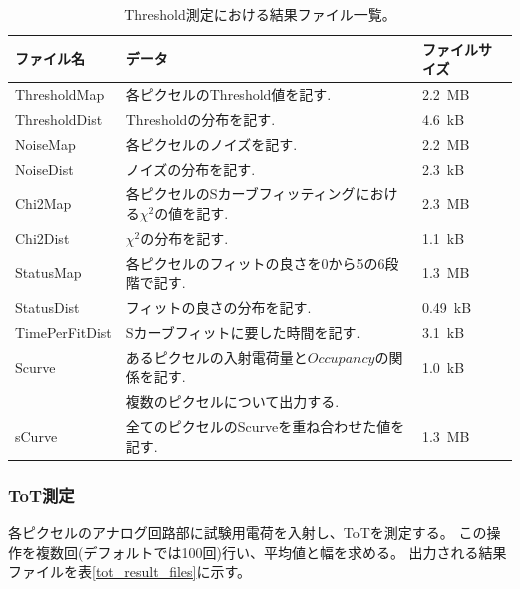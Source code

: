 \begin{table}[tbp]
\begin{center}
\caption[Threshold測定における結果ファイル一覧]{Threshold測定における結果ファイル一覧。}
\label{threshold_result_files}
  \small
  \begin{tabular}{|lll|} \hline
    ファイル名 & データ & ファイルサイズ \\ \hline
    ThresholdMap   & 各ピクセルのThreshold値を記す.                                                         & 2.2~MB \\
    ThresholdDist  & Thresholdの分布を記す.                                                                 & 4.6~kB \\ 
    NoiseMap       & 各ピクセルのノイズを記す.                                                              & 2.2~MB \\ 
    NoiseDist      & ノイズの分布を記す.                                                                    & 2.3~kB \\ 
    Chi2Map        & 各ピクセルのSカーブフィッティングにおける$\chi^2$の値を記す.                           & 2.3~MB \\ 
    Chi2Dist       & $\chi^2$の分布を記す.                                                                  & 1.1~kB \\ 
    StatusMap      & 各ピクセルのフィットの良さを0から5の6段階で記す.                                       & 1.3~MB \\ 
    StatusDist     & フィットの良さの分布を記す.                                                            & 0.49~kB \\ 
    TimePerFitDist & Sカーブフィットに要した時間を記す.                                                     & 3.1~kB \\ 
    Scurve         & あるピクセルの入射電荷量と$Occupancy$の関係を記す.                                     & 1.0~kB \\ 
                   & 複数のピクセルについて出力する.                                                        &        \\ 
    sCurve         & 全てのピクセルのScurveを重ね合わせた値を記す.                                          & 1.3~MB \\ \hline 
  \end{tabular}
\end{center}
\end{table}

\subsubsection{ToT測定}
各ピクセルのアナログ回路部に試験用電荷を入射し、ToTを測定する。
この操作を複数回(デフォルトでは100回)行い、平均値と幅を求める。
出力される結果ファイルを表\ref{tot_result_files}に示す。

